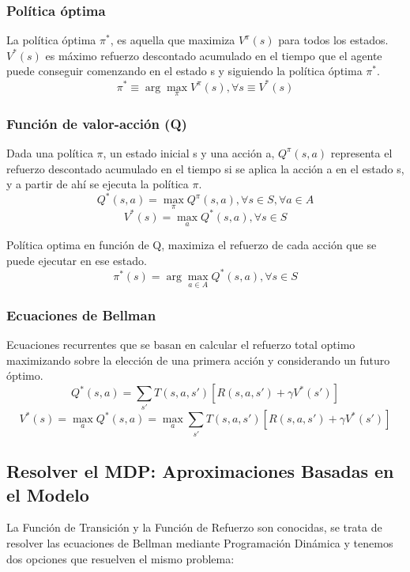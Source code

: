 \documentclass[12pt]{report} %
\begin{document}
\subsubsection{Política óptima}
La política óptima $\pi^*$, es aquella que maximiza $V^\pi (s)$ para todos los estados. $V^* (s)$ es máximo refuerzo descontado acumulado en el tiempo que el agente puede conseguir comenzando en el estado s y siguiendo la política óptima $\pi^*$.
$$\pi ^* \equiv \arg \max_\pi V^\pi (s), \forall s \equiv V^* (s)$$

\subsubsection{Función de valor-acción (Q)}
Dada una política $\pi$, un estado inicial s y una acción a, $Q^\pi (s, a)$ representa el refuerzo descontado acumulado en el tiempo si se aplica la acción a en el estado s, y a partir de ahí se ejecuta la política $\pi$.
$$Q^* (s, a) = \max_\pi Q^\pi (s,a), \forall s \in S, \forall a \in A$$
$$V^* (s) = \max_a Q^* (s,a), \forall s \in S$$

Política optima en función de Q, maximiza el refuerzo de cada acción que se puede ejecutar en ese estado.
$$\pi^* (s) = \arg \max_{a \in A} Q^* (s,a), \forall s \in S$$

\subsubsection{Ecuaciones de Bellman}
Ecuaciones recurrentes que se basan en calcular el refuerzo total optimo maximizando sobre la elección de una primera acción y considerando un futuro óptimo.
$$Q^* (s, a) = \sum _{s'} T(s,a, s') [R(s,a,s') + \gamma V^* (s')]$$
$$V^* (s) = \max_a Q^*(s,a) = \max _a \sum _{s'} T(s,a, s') [R(s,a,s') + \gamma V^* (s')]$$

\subsection{Resolver el MDP: Aproximaciones Basadas en el Modelo}
La Función de Transición y la Función de Refuerzo son conocidas, se trata de resolver las ecuaciones de Bellman mediante Programación Dinámica y tenemos dos opciones que resuelven el mismo problema:
\end{document}
